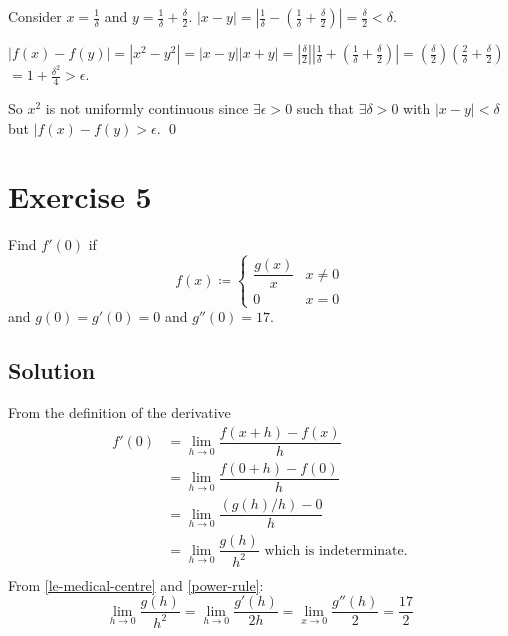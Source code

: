 \documentclass{article}
\begin{document}
Consider $x=\frac{1}{\delta}$ and $y=\frac{1}{\delta}+\frac{\delta}{2}$. $|x-y| = |\frac{1}{\delta}-(\frac{1}{\delta}+\frac{\delta}{2})| = \frac{\delta}{2}<\delta$.

$|f(x)-f(y)| = |x^2-y^2| = |x-y||x+y| = |\frac{\delta}{2}||\frac{1}{\delta}+(\frac{1}{\delta}+\frac{\delta}{2})| = (\frac{\delta}{2})(\frac{2}{\delta}+\frac{\delta}{2})$
$=1+\frac{\delta^2}{4}>\epsilon$.

So $x^2$ is not uniformly continuous since $\exists \epsilon>0$ such that $\exists \delta > 0$ with $|x-y|<\delta$
but $|f(x)-f(y)>\epsilon$. \qed

\section{Exercise 5}
Find $f'(0)$ if
\begin{equation}
	f(x) \coloneq
	\begin{cases}
		\dfrac{g(x)}{x} & x \ne 0 \\
		0               & x=0
	\end{cases}
\end{equation}
and $g(0)=g'(0)=0$ and $g''(0)=17$.

\subsection{Solution}

From the definition of the derivative
\begin{align*}
	f'(0) & = \lim_{h \to 0}\dfrac{f(x+h)-f(x)}{h}                            \\[0.5em]
	      & = \lim_{h \to 0}\dfrac{f(0+h)-f(0)}{h}                            \\[0.5em]
	      & = \lim_{h \to 0}\dfrac{(g(h)/h)-0}{h}                             \\[0.5em]
	      & = \lim_{h \to 0}\dfrac{g(h)}{h^2} \text{ which is indeterminate.} \\[0.5em]
\end{align*}
From \cref{le-medical-centre} and \cref{power-rule}:
\begin{equation}
	\lim_{h \to 0}\dfrac{g(h)}{h^2}=\lim_{h \to 0}\dfrac{g'(h)}{2h}=\lim_{x \to 0}\dfrac{g''(h)}{2}=\dfrac{17}{2}
\end{equation}
\end{document}
